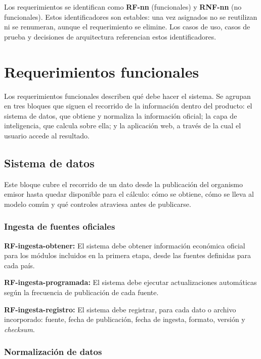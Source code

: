 \documentclass[11pt,a4paper]{article}
\newcommand{\rf}[2]{%
  \noindent
  \textbf{RF-#1:} #2
  \par\smallskip
}
\begin{document}
Los requerimientos se identifican como \textbf{RF-nn} (funcionales) y
\textbf{RNF-nn} (no funcionales). Estos identificadores son estables: una vez
asignados no se reutilizan ni se renumeran, aunque el requerimiento se elimine.
Los casos de uso, casos de prueba y decisiones de arquitectura referencian estos
identificadores.

\section{Requerimientos funcionales}
\label{sec:rf}

Los requerimientos funcionales describen qué debe hacer el sistema. Se agrupan
en tres bloques que siguen el recorrido de la información dentro del producto:
el sistema de datos, que obtiene y normaliza la información oficial; la capa de
inteligencia, que calcula sobre ella; y la aplicación web, a través de la cual
el usuario accede al resultado.

\subsection{Sistema de datos}

Este bloque cubre el recorrido de un dato desde la publicación del organismo
emisor hasta quedar disponible para el cálculo: cómo se obtiene, cómo se lleva
al modelo común y qué controles atraviesa antes de publicarse.

\subsubsection{Ingesta de fuentes oficiales}

\rf{ingesta-obtener}{El sistema debe obtener informaci\'on econ\'omica oficial
para los m\'odulos incluidos en la primera etapa, desde las fuentes definidas
para cada pa\'is.}

\rf{ingesta-programada}{El sistema debe ejecutar actualizaciones autom\'aticas
seg\'un la frecuencia de publicaci\'on de cada fuente.}

\rf{ingesta-registro}{El sistema debe registrar, para cada dato o archivo
incorporado: fuente, fecha de publicaci\'on, fecha de ingesta, formato,
versi\'on y \emph{checksum}.}

\subsubsection{Normalización de datos}
\end{document}
